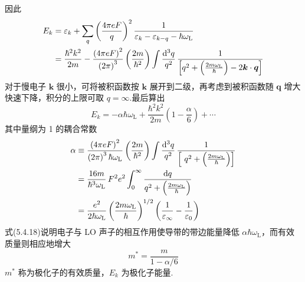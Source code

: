 因此
\begin{equation*}
\begin{aligned}
  E_k&=\varepsilon_k+\sum_{q}\left(\frac{4\pi eF}{q}\right)^2
  \frac{1}{\varepsilon_k-\varepsilon_{k-q}-\hbar\omega_{\mathrm{L}}}\\
  &=\frac{\hbar^2k^2}{2m}-\frac{\left(4\pi eF\right)^2}{\left(2\pi\right)^3}\left(\frac{2m}{\hbar^2}\right)
  \int\frac{\mathrm{d}^3q}{q^2}\,
  \frac{1}{\Bigl[q^2+\Bigl(\frac{2m\omega_{\mathrm{L}}}{\hbar}\Bigr)-2\boldsymbol{k}\cdot\boldsymbol{q}\Bigr]}
\end{aligned}
\end{equation*}
对于慢电子 $\boldsymbol{k}$ 很小，可将被积函数按 $\boldsymbol{k}$ 展开到二级，再考虑到被积函数随 $\boldsymbol{q}$ 增大快速下降，积分的上限可取 $q=\infty$.最后算出
\begin{equation}
  E_k=-\alpha\hbar\omega_{\mathrm{L}}+\frac{\hbar^2k^2}{2m}
  \left(1-\frac{\alpha}{6}\right)+\cdots
\end{equation}
其中量纲为 1 的耦合常数
\begin{equation}
\begin{aligned}
  \alpha&\equiv\frac{\left(4\pi eF\right)^2}{\left(2\pi\right)^3\hbar\omega_{\mathrm{L}}}
  \left(\frac{2m}{\hbar^2}\right)\int\frac{\mathrm{d}^3q}{q^2}\,
  \frac{1}{\Bigl[\ q^2+\Bigl(\frac{2m\omega_{\mathrm{L}}}{\hbar}\Bigr)\Bigr]}\\
  &=\frac{16m}{\hbar^3\omega_{\mathrm{L}}}\,F^2e^2\int_{0}^{\infty}
  \frac{\mathrm{d}q}{q^2+\Bigl(\frac{2m\omega_{\mathrm{L}}}{\hbar}\Bigr)}\\
  &=\frac{e^2}{2\hbar\omega_{\mathrm{L}}}\left(\frac{2m\omega_{\mathrm{L}}}{\hbar}\right)^{1/2}
  \left(\frac{1}{\varepsilon_{\infty}}-\frac{1}{\varepsilon_0}\right)
\end{aligned}
\end{equation}
式(5.4.18)说明电子与 LO 声子的相互作用使导带的带边能量降低 $\alpha\hbar\omega_{\mathrm{L}}$，而有效质量则相应地增大
\begin{equation}
  m^{*}=\frac{m}{1-\alpha/6}
\end{equation}
$m^{*}$ 称为极化子的有效质量，$E_k$ 为极化子能量.

